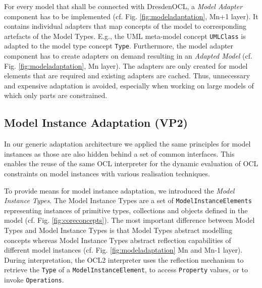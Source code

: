 	For every model that shall be connected with DresdenOCL, 
	a \emph{Model Adapter} component has to be implemented (cf. Fig. \ref{fig:modeladaptation}, Mn+1 layer). 
	It contains individual adapters that map concepts of the model to corresponding artefacts of the Model Types. E.g., the UML
	meta-model concept \texttt{UMLClass} is adapted to the model type concept
	\texttt{Type}. 
	Furthermore, the model adapter component has to create 
	adapters on demand resulting in an \textit{Adapted Model} (cf. Fig.
	\ref{fig:modeladaptation}, Mn layer).
	The adapters are only created for model elements that are required and
	existing adapters are cached. Thus, unnecessary and expensive adaptation is avoided, 
	especially when working on large models of which only parts are constrained.


\subsection{Model Instance Adaptation (VP2)}
	
	In our generic adaptation architecture we applied the same principles for model instances as those are also hidden behind a set of common
	interfaces. This enables the reuse of the same OCL interpreter for the dynamic
	evaluation of OCL constraints on model instances with various realisation techniques.
	
	To provide means for model instance adaptation, we introduced the
	\emph{Model Instance Types}. The Model Instance Types are a set of \texttt{ModelInstanceElements}
	representing instances of primitive types, 
	collections and objects defined in the model (cf. Fig. \ref{fig:coreconcepts}). 
  The most important difference between Model Types and Model Instance Types
	is that Model Types abstract modelling concepts whereas Model Instance Types abstract 
	reflection capabilities of different model instances (cf. Fig. \ref{fig:modeladaptation} Mn and Mn-1 layer).
	During interpretation, the OCL2 interpreter uses the reflection mechanism to
	retrieve the \texttt{Type} of a \texttt{ModelInstanceElement}, to access \texttt{Property}
	values, or to invoke \texttt{Operations}.
	

